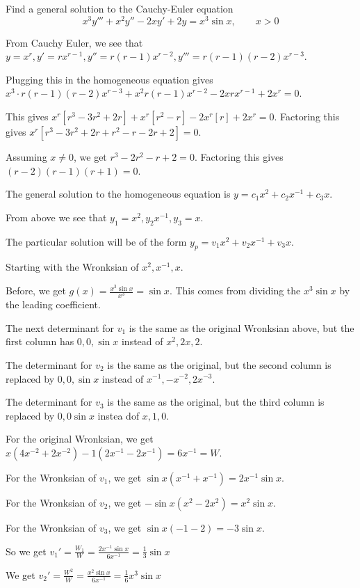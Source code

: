 \documentclass[../diffeq.tex]{subfiles}
\begin{document}
\pagebreak
\begin{example}
    Find a general solution to the Cauchy-Euler equation 
    \[ x^3y'''+x^2y''-2xy'+2y=x^3\sin x, \qquad x>0 \]

    From Cauchy Euler, we see that $y=x^r, y'=rx^{r-1}, y''=r(r-1)x^{r-2}, y'''=r(r-1)(r-2)x^{r-3}$.

    Plugging this in the homogeneous equation gives $x^3\cdot r(r-1)(r-2)x^{r-3}+x^2r(r-1)x^{r-2}-2xrx^{r-1}+2x^r=0$.

    This gives $x^r[r^3-3r^2+2r]+x^r[r^2-r]-2x^r[r]+2x^r=0$. Factoring this gives $x^r[r^3-3r^2+2r+r^2-r-2r+2]=0$.

    Assuming $x\neq 0$, we get $r^3-2r^2-r+2=0$. Factoring this gives $(r-2)(r-1)(r+1)=0$.

    The general solution to the homogeneous equation is $y=c_1x^2+c_2x^{-1}+c_3x$.

    From above we see that $y_1=x^2,y_2x^{-1},y_3=x$.

    The particular solution will be of the form $y_p=v_1x^2+v_2x^{-1}+v_3x$.

    Starting with the Wronksian of $x^2,x^{-1},x$. 

    Before, we get $g(x)=\frac{x^3\sin x}{x^3}=\sin x$. This comes from dividing the $x^3\sin x$ by the leading coefficient.

    The next determinant for $v_1$ is the same as the original Wronksian above, but the first column has $0,0,\sin x$ instead of $x^2,2x,2$.

    The determinant for $v_2$ is the same as the original, but the second column is replaced by $0,0,\sin x$ instead of $x^{-1},-x^{-2},2x^{-3}$.

    The determinant for $v_3$ is the same as the original, but the third column is replaced by $0,0\sin x$ instea dof $x,1,0$.

    For the original Wronksian, we get $x(4x^{-2}+2x^{-2})-1(2x^{-1}-2x^{-1})=6x^{-1} = W$.

    For the Wronksian of $v_1$, we get $\sin x (x^{-1}+x^{-1})=2x^{-1}\sin x$.

    For the Wronksian of $v_2$, we get $-\sin x(x^2-2x^2)=x^2\sin x$.

    For the Wronksian of $v_3$, we get $\sin x(-1-2)=-3\sin x$.

    So we get $v_1'=\frac{W_1}{W}=\frac{2x^{-1}\sin x}{6x^{-1}}=\frac{1}{3}\sin x$

    We get $v_2'=\frac{W^2}{W}=\frac{x^2\sin x}{6x^{-1}}=\frac{1}{6}x^3\sin x$


\end{example}
\end{document}
